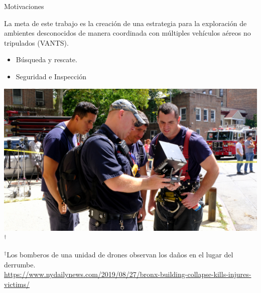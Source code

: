 \documentclass[
  24pt, %
  aspectratio=169, %
]{beamer}
\begin{document}
\begin{frame}{Motivaciones}
  \begin{minipage}{0.47\textwidth}

    \small La meta de este trabajo es la creación de una estrategia para la exploración de ambientes desconocidos de manera coordinada con múltiples vehículos aéreos no tripulados (VANTS).
    \bigskip %
    \begin{itemize}
    \item Búsqueda y rescate.
    \item Seguridad e Inspección
    \end{itemize}
  \end{minipage}
  \hspace{0.2cm}
  \begin{minipage}{0.5\textwidth}
    \includegraphics[width=\textwidth]{drone-staff.jpg}$^\dag$\\
      \rule{0in}{1.2em}$^\dag$\scriptsize Los bomberos de una unidad de drones observan los daños en el lugar del derrumbe.\\
      \tiny \url{https://www.nydailynews.com/2019/08/27/bronx-building-collapse-kills-injures-victims/} 
  \end{minipage}
\end{frame}
\end{document}

